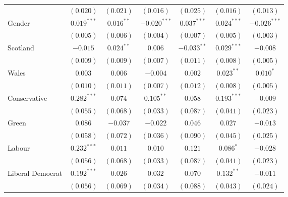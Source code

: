\documentclass{article}
\begin{document}
\begin{table}
\begin{center}
{\begin{tabular}{l c c c c c c}
                                 & $(0.020)$      & $(0.021)$      & $(0.016)$      & $(0.025)$      & $(0.016)$      & $(0.013)$      \\
Gender                           & $0.019^{***}$  & $0.016^{**}$   & $-0.020^{***}$ & $0.037^{***}$  & $0.024^{***}$  & $-0.026^{***}$ \\
                                 & $(0.005)$      & $(0.006)$      & $(0.004)$      & $(0.007)$      & $(0.005)$      & $(0.003)$      \\
Scotland                         & $-0.015$       & $0.024^{**}$   & $0.006$        & $-0.033^{**}$  & $0.029^{***}$  & $-0.008$       \\
                                 & $(0.009)$      & $(0.009)$      & $(0.007)$      & $(0.011)$      & $(0.008)$      & $(0.005)$      \\
Wales                            & $0.003$        & $0.006$        & $-0.004$       & $0.002$        & $0.023^{**}$   & $0.010^{*}$    \\
                                 & $(0.010)$      & $(0.011)$      & $(0.007)$      & $(0.012)$      & $(0.008)$      & $(0.005)$      \\
Conservative                     & $0.282^{***}$  & $0.074$        & $0.105^{**}$   & $0.058$        & $0.193^{***}$  & $-0.009$       \\
                                 & $(0.055)$      & $(0.068)$      & $(0.033)$      & $(0.087)$      & $(0.041)$      & $(0.023)$      \\
Green                            & $0.086$        & $-0.037$       & $-0.022$       & $0.046$        & $0.027$        & $-0.013$       \\
                                 & $(0.058)$      & $(0.072)$      & $(0.036)$      & $(0.090)$      & $(0.045)$      & $(0.025)$      \\
Labour                           & $0.232^{***}$  & $0.011$        & $0.010$        & $0.121$        & $0.086^{*}$    & $-0.028$       \\
                                 & $(0.056)$      & $(0.068)$      & $(0.033)$      & $(0.087)$      & $(0.041)$      & $(0.023)$      \\
Liberal Democrat                 & $0.192^{***}$  & $0.026$        & $0.032$        & $0.070$        & $0.132^{**}$   & $-0.011$       \\
                                 & $(0.056)$      & $(0.069)$      & $(0.034)$      & $(0.088)$      & $(0.043)$      & $(0.024)$      \\

\end{tabular}}
\end{center}
\end{table}
\end{document}
